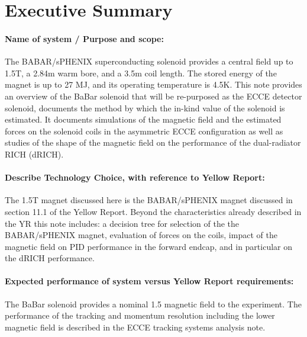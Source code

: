 %

\section{Executive Summary}

\paragraph{Name of system / Purpose and scope: \\}
The BABAR/sPHENIX superconducting solenoid provides a central field up to 1.5T, a 2.84m warm bore, and a 3.5m coil length. The stored energy of the magnet is up to 27 MJ, and its operating temperature is 4.5K. This note provides an overview of the BaBar solenoid that will be re-purposed as the ECCE detector solenoid, documents the method by which the in-kind value of the solenoid is estimated. It documents simulations of the magnetic field and the estimated forces on the solenoid coils in the asymmetric ECCE configuration as well as studies of the shape of the magnetic field on the performance of the dual-radiator RICH (dRICH). 

\paragraph{Describe Technology Choice, with reference to Yellow Report: \\}
The 1.5T magnet discussed here is the BABAR/sPHENIX magnet discussed in section 11.1 of the Yellow Report. Beyond the characteristics already described in the YR this note includes: a decision tree for selection of the the BABAR/sPHENIX magnet, evaluation of forces on the coils, impact of the magnetic field on PID performance in the forward endcap, and in particular on the dRICH performance.

\paragraph{Expected performance of system versus Yellow Report requirements: \\}
The BaBar solenoid provides 
a nominal 1.5 magnetic field to the experiment. The performance of the tracking and momentum resolution 
including the lower magnetic field is described in the ECCE tracking systems analysis note. 

